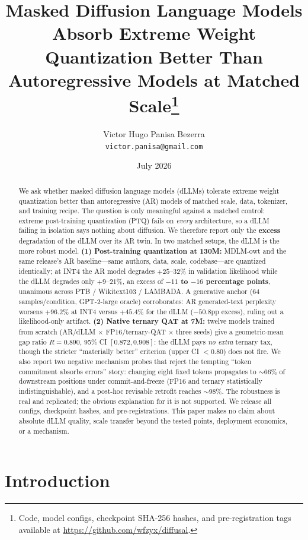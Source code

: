 \documentclass[11pt]{article}
\title{\textbf{Masked Diffusion Language Models Absorb Extreme Weight\\
Quantization Better Than Autoregressive Models at Matched Scale}\thanks{Code, model configs, checkpoint SHA-256 hashes, and pre-registration tags available at \url{https://github.com/wfzyx/diffusal}.}}
\author{Victor Hugo Panisa Bezerra\\\texttt{victor.panisa@gmail.com}}
\date{July 2026}
\begin{document}
\maketitle

\begin{abstract}
We ask whether masked diffusion language models (dLLMs) tolerate extreme weight quantization better than autoregressive (AR) models of matched scale, data, tokenizer, and training recipe. The question is only meaningful against a matched control: extreme post-training quantization (PTQ) fails on \emph{every} architecture, so a dLLM failing in isolation says nothing about diffusion. We therefore report only the \textbf{excess} degradation of the dLLM over its AR twin. In two matched setups, the dLLM is the more robust model. \textbf{(1) Post-training quantization at 130M:} MDLM-owt and the same release's AR baseline---same authors, data, scale, codebase---are quantized identically; at INT4 the AR model degrades $+25$--$32\%$ in validation likelihood while the dLLM degrades only $+9$--$21\%$, an excess of \textbf{$-11$ to $-16$ percentage points}, unanimous across PTB / Wikitext103 / LAMBADA. A generative anchor (64 samples/condition, GPT-2-large oracle) corroborates: AR generated-text perplexity worsens $+96.2\%$ at INT4 versus $+45.4\%$ for the dLLM ($-50.8$pp excess), ruling out a likelihood-only artifact. \textbf{(2) Native ternary QAT at 7M:} twelve models trained from scratch (AR/dLLM $\times$ FP16/ternary-QAT $\times$ three seeds) give a geometric-mean gap ratio $R = 0.890$, 95\% CI $[0.872, 0.908]$: the dLLM pays \emph{no extra} ternary tax, though the stricter ``materially better'' criterion (upper CI $< 0.80$) does not fire. We also report two negative mechanism probes that reject the tempting ``token commitment absorbs errors'' story: changing eight fixed tokens propagates to $\sim$66\% of downstream positions under commit-and-freeze (FP16 and ternary statistically indistinguishable), and a post-hoc revisable retrofit reaches $\sim$98\%. The robustness is real and replicated; the obvious explanation for it is not supported. We release all configs, checkpoint hashes, and pre-registrations. This paper makes no claim about absolute dLLM quality, scale transfer beyond the tested points, deployment economics, or a mechanism.
\end{abstract}

\section{Introduction}
\end{document}
